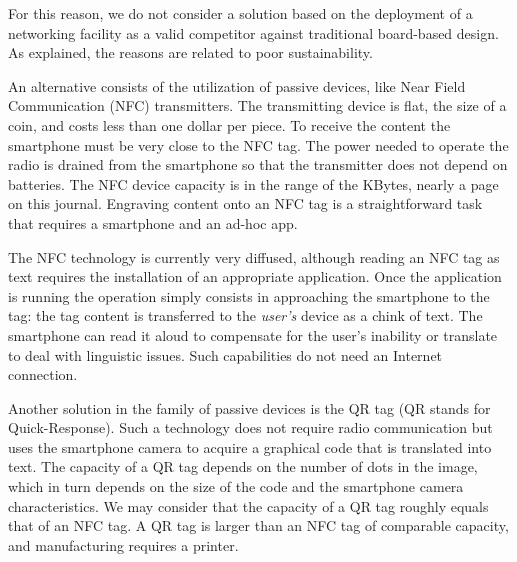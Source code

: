 \documentclass[sustainability,article,submit,pdftex,moreauthors]{Definitions/mdpi}
\begin{document}
For this reason, we do not consider a solution based on the deployment of a networking facility as a valid competitor against traditional board-based design. As explained, the reasons are related to poor sustainability.

An alternative consists of the utilization of passive devices, like Near Field Communication (NFC) transmitters. The transmitting device is flat, the size of a coin, and costs less than one dollar per piece. To receive the content the smartphone must be very close to the NFC tag. The power needed to operate the radio is drained from the smartphone so that the transmitter does not depend on batteries. The NFC device capacity is in the range of the KBytes, nearly a page on this journal. Engraving content onto an NFC tag is a straightforward task that requires a smartphone and an ad-hoc app.

The NFC technology is currently very diffused, although reading an NFC tag as text requires the installation of an appropriate application. Once the application is running the operation simply consists in approaching the smartphone to the tag: the tag content is transferred to the {\em user's} device as a chink of text. The smartphone can read it aloud to compensate for the user's inability or translate to deal with linguistic issues. Such capabilities do not need an Internet connection.

Another solution in the family of passive devices is the QR tag (QR stands for Quick-Response). Such a technology does not require radio communication but uses the smartphone camera to acquire a graphical code that is translated into text. The capacity of a QR tag depends on the number of dots in the image, which in turn depends on the size of the code and the smartphone camera characteristics. We may consider that the capacity of a QR tag roughly equals that of an NFC tag. A QR tag is larger than an NFC tag of comparable capacity, and manufacturing requires a printer.
\end{document}
